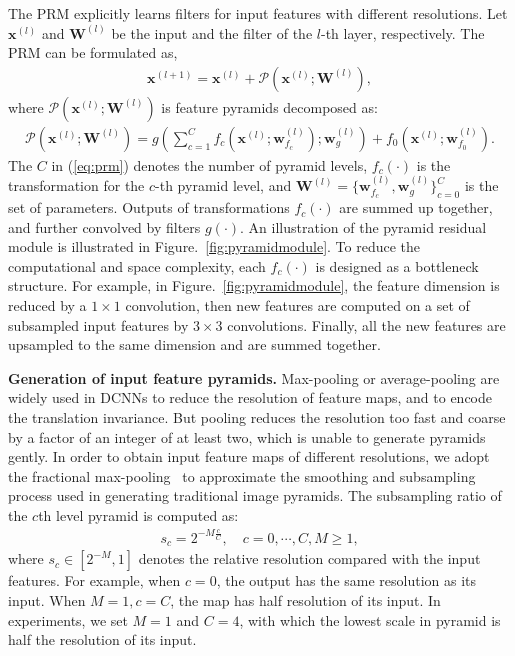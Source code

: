 \documentclass[10pt,twocolumn,letterpaper]{article}
\newcommand{\smalltitle}[1]{\vspace{0.2em}\noindent \textbf{{#1}}}
\newcommand{\cP}{\mathcal{P}}
\newcommand{\W}{\mathbf{W}}
\newcommand{\w}{\mathbf{w}}
\newcommand{\bx}{\mathbf{x}}
\begin{document}
The PRM explicitly learns filters for input features with different resolutions. 
Let $\bx^{(l)}$ and $\W^{(l)}$ be the input and the filter of the $l$-th layer, respectively. 
The PRM can be formulated as,
{\small
\begin{align}
	\bx^{(l+1)} = \bx^{(l)} + \cP(\bx^{(l)}; \W^{(l)}),
\end{align}
}
\!\!where $ \cP(\bx^{(l)}; \W^{(l)})$ is feature pyramids decomposed as:
{\small 
\begin{align}
	\cP(\bx^{(l)}; \W^{(l)}) = g\left(\sum_{c=1}^{C} f_c(\bx^{(l)}; \w^{(l)}_{f_c}); \w^{(l)}_g \right) +  f_0(\bx^{(l)}; \w^{(l)}_{f_0}).
\label{eq:prm}
\end{align}
}
\!\!The $C$ in (\ref{eq:prm}) denotes the number of pyramid levels, $f_c(\cdot)$ is the transformation for the $c$-th pyramid level, and $\W^{(l)} = \{\w^{(l)}_{f_c}, \w^{(l)}_g\}_{c=0}^C$ is the set of parameters. 
Outputs of transformations $f_c(\cdot)$ are summed up together, and further convolved by filters $g(\cdot)$. 
An illustration of the pyramid residual module is illustrated in Figure.~\ref{fig:pyramidmodule}. 
To reduce the computational and space complexity, each $f_c(\cdot)$ is designed as a bottleneck structure. 
For example, in Figure.~\ref{fig:pyramidmodule}, the feature dimension is reduced by a $1\times 1$ convolution, then new features are computed on a set of subsampled input features by $3\times3$ convolutions.
Finally, all the new features are upsampled to the same dimension and are summed together.  


\smalltitle{Generation of input feature pyramids. }
Max-pooling or average-pooling are widely used in DCNNs to reduce the resolution of feature maps, and to encode the translation invariance. 
But pooling reduces the resolution too fast and coarse by a factor of an integer of at least two, which is unable to generate pyramids gently.   
In order to obtain input feature maps of different resolutions, we adopt the fractional max-pooling~\cite{graham2014fractional} to approximate the smoothing and subsampling process used in generating traditional image pyramids. 
The subsampling ratio of the $c$th level pyramid is computed as:
\begin{align}
	s_c = 2^{-M \frac{c}{C}}, \quad c = 0, \cdots, C, M \geq 1,
\end{align}
where $s_c \in [2^{-M}, 1]$ denotes the relative resolution compared with the input features. 
For example, when $c=0$, the output  has the same resolution as its input. 
When $ M=1, c=C$, the map has half resolution of its input. 
In experiments, we set $M=1$ and $C=4$, with which the lowest scale in pyramid is half the resolution of its input.
\end{document}
